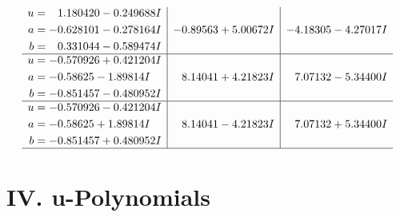 \documentclass[1p]{elsarticle_modified}
\theoremstyle{definition}
\begin{document}
$$\begin{array}{c|c|c}
\begin{aligned}
u &= \phantom{-}1.180420 - 0.249688 I \\
a &= -0.628101 - 0.278164 I \\
b &= \phantom{-}0.331044 - 0.589474 I\end{aligned}
 & -0.89563 + 5.00672 I & -4.18305 - 4.27017 I \\ \hline\begin{aligned}
u &= -0.570926 + 0.421204 I \\
a &= -0.58625 - 1.89814 I \\
b &= -0.851457 - 0.480952 I\end{aligned}
 & \phantom{-}8.14041 + 4.21823 I & \phantom{-}7.07132 - 5.34400 I \\ \hline\begin{aligned}
u &= -0.570926 - 0.421204 I \\
a &= -0.58625 + 1.89814 I \\
b &= -0.851457 + 0.480952 I\end{aligned}
 & \phantom{-}8.14041 - 4.21823 I & \phantom{-}7.07132 + 5.34400 I\\
 \hline 
 \end{array}$$\newpage
\newpage\renewcommand{\arraystretch}{1}
\centering \section*{ IV. u-Polynomials}
\end{document}
